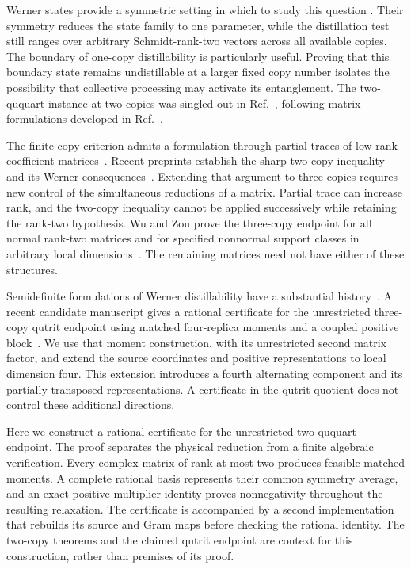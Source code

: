 \documentclass[aps,pra,reprint,superscriptaddress,amsmath,amssymb,floatfix,nofootinbib]{revtex4-2}
\begin{document}
Werner states provide a symmetric setting in which to study this question
\cite{Werner,DCLB,DSS,Five}. Their symmetry reduces the state family to one
parameter, while the distillation test still ranges over arbitrary
Schmidt-rank-two vectors across all available copies. The boundary of
one-copy distillability is particularly useful. Proving that this boundary
state remains undistillable at a larger fixed copy number isolates the
possibility that collective processing may activate its entanglement.
The two-ququart instance at two copies was singled out in
Ref.~\cite{Five}, following matrix formulations developed in
Ref.~\cite{PPHH}.

The finite-copy criterion admits a formulation through partial traces of
low-rank coefficient matrices~\cite{CostaRico}.
Recent preprints establish the sharp two-copy inequality and its Werner
consequences~\cite{SC,FHPV,FGP,BGH}. Extending that argument to three copies
requires new control of the simultaneous reductions of a matrix.
Partial trace can increase rank, and the two-copy inequality cannot be
applied successively while retaining the rank-two hypothesis.
Wu and Zou prove the three-copy endpoint for all normal rank-two matrices
and for specified nonnormal support classes in arbitrary local
dimensions~\cite{WZ}.
The remaining matrices need not have either of these structures.

Semidefinite formulations of Werner distillability have a substantial
history~\cite{VD}. A recent candidate manuscript gives a rational
certificate for the unrestricted three-copy qutrit endpoint using
matched four-replica moments and a coupled positive block~\cite{Candidate}.
We use that moment construction, with its unrestricted second matrix
factor, and extend the source coordinates and positive representations
to local dimension four. This extension introduces a fourth alternating
component and its partially transposed representations. A certificate in
the qutrit quotient does not control these additional directions.

Here we construct a rational certificate for the unrestricted two-ququart
endpoint. The proof separates the physical reduction from a finite
algebraic verification. Every complex matrix of rank at most two produces
feasible matched moments. A complete rational basis represents their
common symmetry average, and an exact positive-multiplier identity proves
nonnegativity throughout the resulting relaxation.
The certificate is accompanied by a second implementation that rebuilds
its source and Gram maps before checking the rational identity.
The two-copy theorems and the claimed qutrit endpoint are context for this
construction, rather than premises of its proof.
\end{document}
